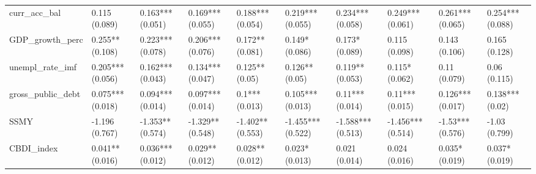 \begin{table}[ht]
\begin{tabular}{llllllllll}
  curr\_acc\_bal & 0.115 (0.089) & 0.163*** (0.051) & 0.169*** (0.055) & 0.188*** (0.054) & 0.219*** (0.055) & 0.234*** (0.058) & 0.249*** (0.061) & 0.261*** (0.065) & 0.254*** (0.088) \\ 
  GDP\_growth\_perc & 0.255** (0.108) & 0.223*** (0.078) & 0.206*** (0.076) & 0.172** (0.081) & 0.149* (0.086) & 0.173* (0.089) & 0.115 (0.098) & 0.143 (0.106) & 0.165 (0.128) \\ 
  unempl\_rate\_imf & 0.205*** (0.056) & 0.162*** (0.043) & 0.134*** (0.047) & 0.125** (0.05) & 0.126** (0.05) & 0.119** (0.053) & 0.115* (0.062) & 0.11 (0.079) & 0.06 (0.115) \\ 
  gross\_public\_debt & 0.075*** (0.018) & 0.094*** (0.014) & 0.097*** (0.014) & 0.1*** (0.013) & 0.105*** (0.013) & 0.11*** (0.014) & 0.11*** (0.015) & 0.126*** (0.017) & 0.138*** (0.02) \\ 
  SSMY & -1.196 (0.767) & -1.353** (0.574) & -1.329** (0.548) & -1.402** (0.553) & -1.455*** (0.522) & -1.588*** (0.513) & -1.456*** (0.514) & -1.53*** (0.576) & -1.03 (0.799) \\ 
  CBDI\_index & 0.041** (0.016) & 0.036*** (0.012) & 0.029** (0.012) & 0.028** (0.012) & 0.023* (0.013) & 0.021 (0.014) & 0.024 (0.016) & 0.035* (0.019) & 0.037* (0.019) \\ 
   \bottomrule
\end{tabular}
\endgroup
\end{table}
